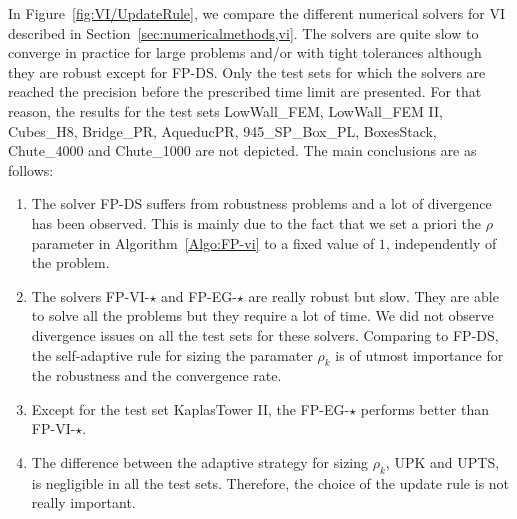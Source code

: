 In Figure~\ref{fig:VI/UpdateRule}, we compare the different numerical solvers for VI described in Section~\ref{sec:numericalmethods,vi}. The solvers are quite slow to converge in practice for large problems and/or with tight tolerances although they are robust except for {\sf FP-DS}. Only the test sets for which the solvers are reached the precision before the prescribed time limit are presented. For that reason, the results for the test sets LowWall\_FEM,  LowWall\_FEM II,  Cubes\_H8, Bridge\_PR, AqueducPR, 945\_SP\_Box\_PL, BoxesStack, Chute\_4000  and Chute\_1000  are not depicted. 
The main conclusions are as follows:
\begin{enumerate}
\item The solver {\sf FP-DS} suffers from robustness problems and a lot of divergence has been observed. This is mainly due to the fact that we set a priori the $\rho$ parameter in Algorithm~\ref{Algo:FP-vi} to a fixed value of $1$, independently of the problem.
\item The solvers {\sf FP-VI-$\star$} and {\sf FP-EG-$\star$} are really robust but slow. They are able to solve all the problems but they require a lot of time. We did not observe divergence issues on all the test sets for these solvers. Comparing to {\sf FP-DS}, the self-adaptive rule for sizing the paramater $\rho_k$ is of utmost importance for the  robustness and the convergence rate.
\item Except for the test set KaplasTower II, the  {\sf FP-EG-$\star$} performs better than  {\sf FP-VI-$\star$}.
\item The difference between the adaptive strategy for sizing $\rho_k$, {\sf UPK} and {\sf UPTS}, is negligible in all the test sets. Therefore, the choice of the update rule is not really important.
\end{enumerate}
